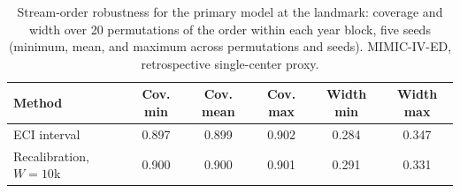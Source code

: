 \begin{table}[t]
\centering
\caption{Stream-order robustness for the primary model at the landmark: coverage and width over 20 permutations of the order within each year block, five seeds (minimum, mean, and maximum across permutations and seeds). MIMIC-IV-ED, retrospective single-center proxy.}
\label{tab:stream}
\begin{tabular}{lccccc}
\toprule
Method & Cov. min & Cov. mean & Cov. max & Width min & Width max \\
\midrule
ECI interval & 0.897 & 0.899 & 0.902 & 0.284 & 0.347 \\
Recalibration, $W = 10$k & 0.900 & 0.900 & 0.901 & 0.291 & 0.331 \\
\bottomrule
\end{tabular}
\end{table}
